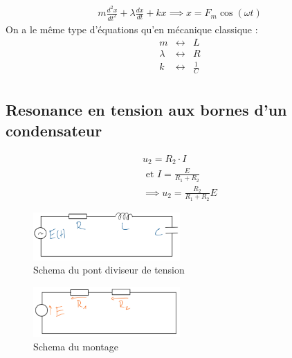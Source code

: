 \begin{remark}
    \begin{eqnarray*}
        m \frac{d^{2}x}{dt^{2}} + \lambda \frac{dx}{dt} + kx \implies x = F_{m}\cos (\omega t)
    \end{eqnarray*}
    On a le même type d'équations qu'en mécanique classique : 
    \begin{eqnarray*}
        m & \leftrightarrow & L \\
        \lambda & \leftrightarrow & R \\
        k & \leftrightarrow & \frac{1}{C} \\
    \end{eqnarray*}
\end{remark}



\subsection{Resonance en tension aux bornes d'un condensateur}

\begin{remark}
    \begin{eqnarray*}
        u_{2} = R_{2} \cdot I \\
        \text{ et } I = \frac{E}{R_{1} + R_{2}}\\
        \implies u_{2} = \frac{R_{2}}{R_{1}+R_{2}}E
    \end{eqnarray*}
\end{remark}

\begin{figure}[!htb]
    \centering
    \includegraphics[width=0.5\textwidth]{SCHEMA13.png}
    \caption{Schema du pont diviseur de tension}
    \label{fig:SCHEMA13}
\end{figure}

\begin{figure}[!htb]
    \centering
    \includegraphics[width=0.5\textwidth]{SCHEMA14.png}
    \caption{Schema du montage}
    \label{fig:SCHEMA14}
\end{figure}

